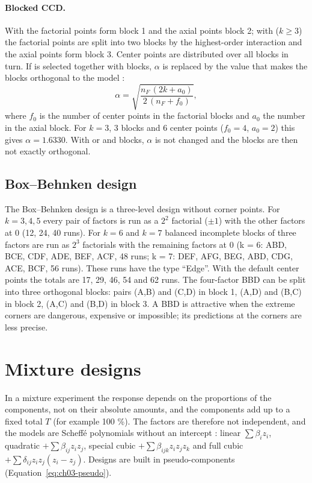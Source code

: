 \paragraph{Blocked CCD.} With  the factorial points form block 1 and the axial points block 2; with
 ($k \ge 3$) the factorial points are split into two blocks by the highest-order interaction and the
axial points form block 3. Center points are distributed over all blocks in turn. If  is selected
together with blocks, $\alpha$ is replaced by the value that makes the blocks orthogonal to the model
\citep{montgomery2017}:
\begin{equation}
\alpha = \sqrt{\frac{n_F\,(2k + a_0)}{2\,(n_F + f_0)}},
\label{eq:ch03-alphablock}
\end{equation}
where $f_0$ is the number of center points in the factorial blocks and $a_0$ the number in the axial block. For
$k = 3$, 3 blocks and 6 center points ($f_0 = 4$, $a_0 = 2$) this gives $\alpha = 1.6330$. With  or
 and blocks, $\alpha$ is not changed and the blocks are then not exactly orthogonal.

\subsection{Box--Behnken design}
\label{sec:ch03-bbd}
The Box--Behnken design \citep{box1960} is a three-level design without corner points. For $k = 3, 4, 5$ every pair
of factors is run as a $2^2$ factorial ($\pm 1$) with the other factors at 0 (12, 24, 40 runs). For $k = 6$ and
$k = 7$ balanced incomplete blocks of three factors are run as $2^3$ factorials with the remaining factors at 0
(k = 6: ABD, BCE, CDF, ADE, BEF, ACF, 48 runs; k = 7: DEF, AFG, BEG, ABD, CDG, ACE, BCF, 56 runs). These runs have
the type ``Edge''. With the default center points the totals are 17, 29, 46, 54 and 62 runs. The four-factor BBD can
be split into three orthogonal blocks: pairs (A,B) and (C,D) in block 1, (A,D) and (B,C) in block 2, (A,C) and (B,D)
in block 3. A BBD is attractive when the extreme corners are dangerous, expensive or impossible; its predictions at
the corners are less precise.

\section{Mixture designs}
\label{sec:ch03-mixture}

In a mixture experiment the response depends on the proportions of the components, not on their absolute amounts,
and the components add up to a fixed total $T$ (for example 100 \%). The factors are therefore not independent, and
the models are Scheff\'e polynomials without an intercept \citep{scheffe1958,cornell2002}: linear
$\sum \beta_i z_i$, quadratic $+\sum\beta_{ij} z_i z_j$, special cubic $+\sum\beta_{ijk} z_i z_j z_k$ and full cubic
$+\sum\delta_{ij} z_i z_j (z_i - z_j)$. Designs are built in pseudo-components (Equation~\ref{eq:ch03-pseudo}).


